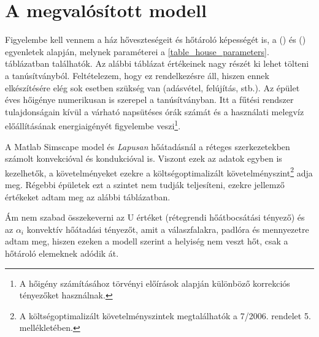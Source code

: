 \section{A megvalósított modell}

Figyelembe kell vennem a ház hőveszteségeit és hőtároló képességét is, a () és () egyenletek alapján, melynek paraméterei a \ref{table_house_parameters}. táblázatban találhatók.
Az alábbi táblázat értékeinek nagy részét ki lehet tölteni a tanúsítványból. Feltételezem, hogy ez rendelkezésre áll, hiszen ennek elkészítésére elég sok esetben szükség van (adásvétel, felújítás, stb.).
Az épület éves hőigénye numerikusan is szerepel a tanúsítványban. Itt a fűtési rendszer tulajdonságain kívül a várható napsütéses órák számát és a használati melegvíz előállításának energiaigényét figyelembe veszi\footnote{A hőigény számításához törvényi előírások alapján különböző korrekciós tényezőket használnak.}.

A Matlab Simscape model és \textit{Lapusan} \cite{LAPUSAN2016320}
 hőátadásnál a réteges szerkezetekben számolt konvekcióval és kondukcióval is. Viszont ezek az adatok egyben is kezelhetők, a követelményeket ezekre a költségoptimalizált követelményszint\footnote{ A  költségoptimalizált követelményszintek megtalálhatók a 7/2006. rendelet \cite{TNM2006} 5. mellékletében.} adja meg. Régebbi épületek ezt a szintet nem tudják teljesíteni, ezekre jellemző értékeket adtam meg az alábbi táblázatban. 

Ám nem szabad összekeverni az U értéket (rétegrendi hőátbocsátási tényező) és az $\alpha_i$ konvektív hőátadási tényezőt, amit a válaszfalakra, padlóra és mennyezetre adtam meg, hiszen ezeken a modell szerint a helyiség nem veszt hőt, csak a hőtároló elemeknek adódik át.




